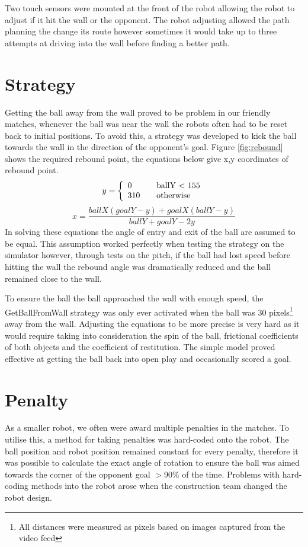 \documentclass[conference,12pt]{IEEEtran}
\begin{document}
Two touch sensors were mounted at the front of the robot allowing the robot to adjust if it hit the wall or the opponent. The robot adjusting allowed the path planning the change its route however sometimes it would take up to three attempts at driving into the wall before finding a better path.

\section{Strategy}
Getting the ball away from the wall proved to be problem in our friendly matches, whenever the ball was near the wall the robots often had to be reset back to initial positions. To avoid this, a strategy was developed to kick the ball towards the wall in the direction of the opponent's goal. Figure \ref{fig:rebound} shows the required rebound point, the equations below give x,y coordinates of rebound point.
\[y = \left\{ 
\begin{array}{l l}
  0 & \quad \mbox{ballY $<$ 155}\\
  310 & \quad \mbox{otherwise}\\ \end{array} \right. \]
\[x = \frac{ballX(goalY-y) + goalX(ballY-y)}{ballY + goalY - 2y} \]
In solving these equations the angle of entry and exit of the ball are assumed to be equal. This assumption worked perfectly when testing the strategy on the simulator however, through tests on the pitch, if the ball had lost speed before hitting the wall the rebound angle was dramatically reduced and the ball remained close to the wall. 

To ensure the ball the ball approached the wall with enough speed, the GetBallFromWall strategy was only ever activated when the ball was 30 pixels\footnote{All distances were measured as pixels based on images captured from the video feed} away from the wall. Adjusting the equations to be more precise is very hard as it would require taking into consideration the spin of the ball, frictional coefficients of both objects and the coefficient of restitution. The simple model proved effective at getting the ball back into open play and occasionally scored a goal.

\section{Penalty}
As a smaller robot, we often were award multiple penalties in the matches. To utilise this, a method for taking penalties was hard-coded onto the robot. The ball position and robot position remained constant for every penalty, therefore it was possible to calculate the exact angle of rotation to ensure the ball was aimed towards the corner of the opponent goal $>$90\% of the time. Problems with hard-coding methods into the robot arose when the construction team changed the robot design.
\end{document}
